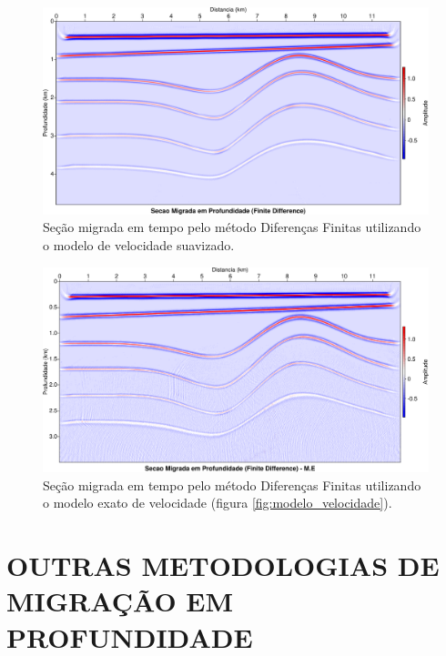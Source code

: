 \begin{landscape}
\begin{figure}[H]
\centering
\includegraphics[totalheight=14cm]{figuras/cap3/seis_mig_deph_fd.pdf}
\caption{Seção migrada em tempo pelo método Diferenças Finitas utilizando o modelo de velocidade suavizado.}
\label{fig:seis_mig_deph_fd}
\end{figure}
\end{landscape}

\begin{landscape}
\begin{figure}[H]
\centering
\includegraphics[totalheight=14cm]{figuras/cap3/seis_mig_depth_fd_me.pdf}
\caption{Seção migrada em tempo pelo método Diferenças Finitas utilizando o modelo exato de velocidade (figura \ref{fig:modelo_velocidade}).}
\label{fig:seis_mig_depth_fd_me}
\end{figure}
\end{landscape}

\section{OUTRAS METODOLOGIAS DE MIGRAÇÃO EM PROFUNDIDADE}

